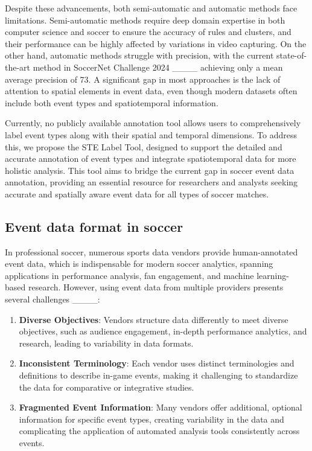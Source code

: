 Despite these advancements, both semi-automatic and automatic methods face limitations. Semi-automatic methods require deep domain expertise in both computer science and soccer to ensure the accuracy of rules and clusters, and their performance can be highly affected by variations in video capturing. On the other hand, automatic methods struggle with precision, with the current state-of-the-art method in SoccerNet Challenge 2024 ____ achieving only a mean average precision of 73. A significant gap in most approaches is the lack of attention to spatial elements in event data, even though modern datasets often include both event types and spatiotemporal information.

Currently, no publicly available annotation tool allows users to comprehensively label event types along with their spatial and temporal dimensions. To address this, we propose the STE Label Tool, designed to support the detailed and accurate annotation of event types and integrate spatiotemporal data for more holistic analysis. This tool aims to bridge the current gap in soccer event data annotation, providing an essential resource for researchers and analysts seeking accurate and spatially aware event data for all types of soccer matches.



\subsection{Event data format in soccer}
\label{ssec:event_data_format_in_soccer}

In professional soccer, numerous sports data vendors provide human-annotated event data, which is indispensable for modern soccer analytics, spanning applications in performance analysis, fan engagement, and machine learning-based research. However, using event data from multiple providers presents several challenges ____:

\begin{enumerate}
\item \textbf{Diverse Objectives}: Vendors structure data differently to meet diverse objectives, such as audience engagement, in-depth performance analytics, and research, leading to variability in data formats.

\item \textbf{Inconsistent Terminology}: Each vendor uses distinct terminologies and definitions to describe in-game events, making it challenging to standardize the data for comparative or integrative studies.

\item \textbf{Fragmented Event Information}: Many vendors offer additional, optional information for specific event types, creating variability in the data and complicating the application of automated analysis tools consistently across events.

\end{enumerate}


